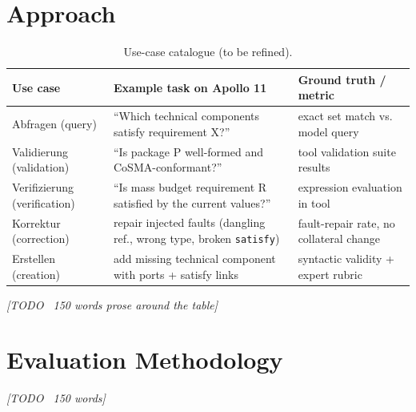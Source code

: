 \section*{Approach}
\begin{table}[h]
\centering
\small
\begin{tabular}{p{2.6cm} p{6.4cm} p{6.4cm}}
\toprule
\textbf{Use case} & \textbf{Example task on Apollo 11} & \textbf{Ground truth / metric} \\
\midrule
Abfragen (query)          & ``Which technical components satisfy requirement X?'' & exact set match vs. model query \\
Validierung (validation)  & ``Is package P well-formed and CoSMA-conformant?'' & tool validation suite results \\
Verifizierung (verification) & ``Is mass budget requirement R satisfied by the current values?'' & expression evaluation in tool \\
Korrektur (correction)    & repair injected faults (dangling ref., wrong type, broken \texttt{satisfy}) & fault-repair rate, no collateral change \\
Erstellen (creation)      & add missing technical component with ports + satisfy links & syntactic validity + expert rubric \\
\bottomrule
\end{tabular}
\caption{Use-case catalogue (to be refined).}
\end{table}
\textit{[TODO ~150 words prose around the table]}

\section*{Evaluation Methodology}
\textit{[TODO ~150 words]}
